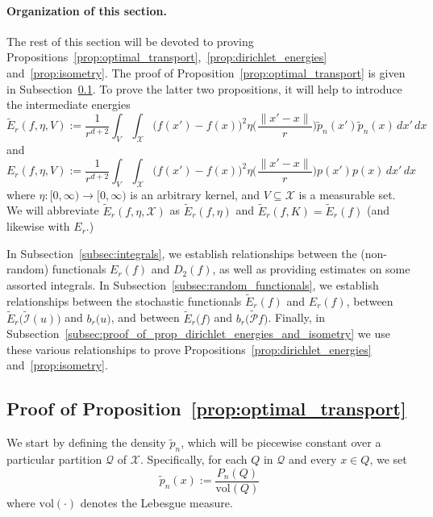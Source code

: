 \documentclass[twoside]{article}
\newcommand{\vol}{\text{vol}}
\newcommand{\1}{\mathbf{1}}
\newcommand{\Xset}{\mathcal{X}}
\newcommand{\mc}[1]{\mathcal{#1}}
\newcommand{\wt}[1]{\widetilde{#1}}
\theoremstyle{definition}
\theoremstyle{remark}
\begin{document}
\paragraph{Organization of this section.}
The rest of this section will be devoted to proving Propositions~\ref{prop:optimal_transport},~\ref{prop:dirichlet_energies} and~\ref{prop:isometry}. The proof of Proposition~\ref{prop:optimal_transport} is given in Subsection~\ref{subsec:proof_proposition_optimal_transport}. To prove the latter two propositions, it will help to introduce the intermediate energies
\begin{equation*}
\wt{E}_r(f,\eta,V) := \frac{1}{r^{d + 2}}\int_{V} \int_{\Xset} \bigl(f(x') - f(x)\bigr)^2 \eta\biggl(\frac{\|x' - x\|}{r}\biggr) \wt{p}_n(x') \wt{p}_n(x) \,dx' \,dx
\end{equation*}
and
\begin{equation*}
{E}_r(f,\eta,V) := \frac{1}{r^{d + 2}}\int_{V} \int_{\Xset} \bigl(f(x') - f(x)\bigr)^2 \eta\biggl(\frac{\|x' - x\|}{r}\biggr) p(x') p(x) \,dx' \,dx
\end{equation*}
where $\eta: [0,\infty) \to [0,\infty)$ is an arbitrary kernel, and $V \subseteq \Xset$ is a measurable set. We will abbreviate $\wt{E}_r(f,\eta,\Xset)$ as $\wt{E}_r(f,\eta)$ and $\wt{E}_r(f,K) = \wt{E}_r(f)$ (and likewise with $E_r$.)

In Subsection~\ref{subsec:integrals}, we establish relationships between the (non-random) functionals $E_r(f)$ and $D_2(f)$, as well as providing estimates on some assorted integrals. In Subsection~\ref{subsec:random_functionals}, we establish relationships between the stochastic functionals $\wt{E}_r(f)$ and $E_r(f)$,  between $\wt{E}_r\bigl(\wt{\mc{I}}(u)\bigr)$ and $b_r\bigl(u\bigr)$, and between $\wt{E}_r\bigl(f\bigr)$ and $b_r\bigl(\wt{\mc{P}}f\bigr)$. Finally, in Subsection~\ref{subsec:proof_of_prop_dirichlet_energies_and_isometry} we use these various relationships to prove Propositions~\ref{prop:dirichlet_energies} and~\ref{prop:isometry}.

\subsection{Proof of Proposition~\ref{prop:optimal_transport}}
\label{subsec:proof_proposition_optimal_transport}

We start by defining the density $\wt{p}_n$, which will be piecewise constant over a particular partition $\mc{Q}$ of $\Xset$. Specifically, for each $Q$ in $\mc{Q}$ and every $x \in Q$, we set
\begin{equation}
\label{pf:prop_optimal_transport_0}
\wt{p}_n(x) := \frac{P_n(Q)}{\vol(Q)}
\end{equation}
where $\vol(\cdot)$ denotes the Lebesgue measure. 
\end{document}
